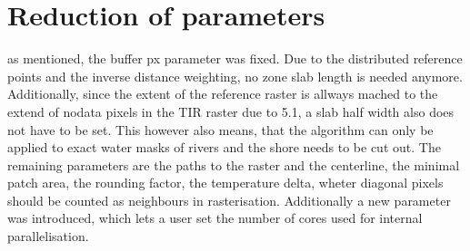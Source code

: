 \section{Reduction of parameters}

as mentioned, the buffer px parameter was fixed. Due to the distributed reference points and the inverse distance weighting, no zone slab length is needed anymore. Additionally, since the extent of the reference raster is allways mached to the extend of nodata pixels in the TIR raster due to 5.1, a slab half width also does not have to be set. This however also means, that the algorithm can only be applied to exact water masks of rivers and the shore needs to be cut out. The remaining parameters are the paths to the raster and the centerline, the minimal patch area, the rounding factor, the temperature delta, wheter diagonal pixels should be counted as neighbours in rasterisation. Additionally a new parameter was introduced, which lets a user set the number of cores used for internal parallelisation.








